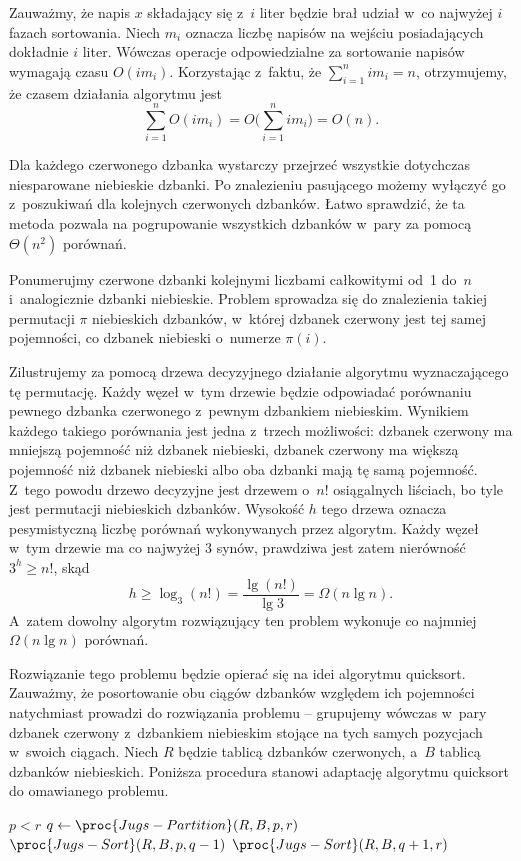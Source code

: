 Zauważmy, że napis $x$ składający się z~$i$ liter będzie brał udział w~co najwyżej $i$ fazach sortowania. Niech $m_i$ oznacza liczbę napisów na wejściu posiadających dokładnie $i$ liter. Wówczas operacje odpowiedzialne za sortowanie napisów  wymagają czasu $O(im_i)$. Korzystając z~faktu, że $\sum_{i=1}^nim_i=n$, otrzymujemy, że czasem działania algorytmu jest
\[
    \sum_{i=1}^nO(im_i) = O\biggl(\sum_{i=1}^nim_i\biggr) = O(n).
\]


\subproblem %
Dla każdego czerwonego dzbanka wystarczy przejrzeć wszystkie dotychczas niesparowane niebieskie dzbanki. Po znalezieniu pasującego możemy wyłączyć go z~poszukiwań dla kolejnych czerwonych dzbanków. Łatwo sprawdzić, że ta metoda pozwala na pogrupowanie wszystkich dzbanków w~pary za pomocą $\Theta(n^2)$ porównań.

\subproblem %
Ponumerujmy czerwone dzbanki kolejnymi liczbami całkowitymi od~1 do~$n$ i~analogicznie dzbanki niebieskie. Problem sprowadza się do znalezienia takiej permutacji $\pi$ niebieskich dzbanków, w~której  dzbanek czerwony jest tej samej pojemności, co dzbanek niebieski o~numerze $\pi(i)$.

Zilustrujemy za pomocą drzewa decyzyjnego działanie algorytmu wyznaczającego tę permutację. Każdy węzeł w~tym drzewie będzie odpowiadać porównaniu pewnego dzbanka czerwonego z~pewnym dzbankiem niebieskim. Wynikiem każdego takiego porównania jest jedna z~trzech możliwości: dzbanek czerwony ma mniejszą pojemność niż dzbanek niebieski, dzbanek czerwony ma większą pojemność niż dzbanek niebieski albo oba dzbanki mają tę samą pojemność. Z~tego powodu drzewo decyzyjne jest drzewem  o~$n!$ osiągalnych liściach, bo tyle jest permutacji niebieskich dzbanków. Wysokość $h$ tego drzewa oznacza pesymistyczną liczbę porównań wykonywanych przez algorytm. Każdy węzeł w~tym drzewie ma co najwyżej 3 synów, prawdziwa jest zatem nierówność $3^h\ge n!$, skąd
\[
	h \ge \log_3(n!) = \frac{\lg(n!)}{\lg3} = \Omega(n\lg n).
\]
A~zatem dowolny algorytm rozwiązujący ten problem wykonuje co najmniej $\Omega(n\lg n)$ porównań.

\subproblem %
Rozwiązanie tego problemu będzie opierać się na idei algorytmu quicksort. Zauważmy, że posortowanie obu ciągów dzbanków względem ich pojemności natychmiast prowadzi do rozwiązania problemu -- grupujemy wówczas w~pary dzbanek czerwony z~dzbankiem niebieskim stojące na tych samych pozycjach w~swoich ciągach. Niech $R$ będzie tablicą dzbanków czerwonych, a~$B$ tablicą dzbanków niebieskich. Poniższa procedura stanowi adaptację algorytmu quicksort do omawianego problemu.
\begin{codebox}
\li	\If $p<r$
\li		\Then
			$q\gets\proc{Jugs-Partition}(R,B,p,r)$
\li			$\proc{Jugs-Sort}(R,B,p,q-1)$
\li			$\proc{Jugs-Sort}(R,B,q+1,r)$
		\End
\end{codebox}


